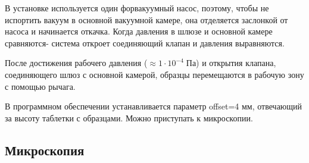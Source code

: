\documentclass[a4paper,12pt]{article}
\theoremstyle{plain} %
\theoremstyle{definition} %
\theoremstyle{remark} %
\newcommand{\e}[1]{
	\cdot 10^{#1}	
}
\newcommand{\s}[0]{
	\;	
}
\begin{document}
В установке используется один форвакуумный насос, поэтому, чтобы не испортить вакуум в основной вакуумной камере, она отделяется заслонкой от насоса и начинается откачка. Когда давления в шлюзе и основной камере сравняются- система откроет соединяющий клапан и давления выравняются. 

После достижения рабочего давления ($ \approx 1\e{-4}\s Па $) и открытия клапана, соединяющего шлюз с основной камерой, образцы перемещаются в рабочую зону с помощью рычага. 

В программном обеспечении устанавливается параметр offset=4 мм, отвечающий за высоту таблетки с образцами. Можно приступать к микроскопии. 
\subsection{Микроскопия}
\end{document}
